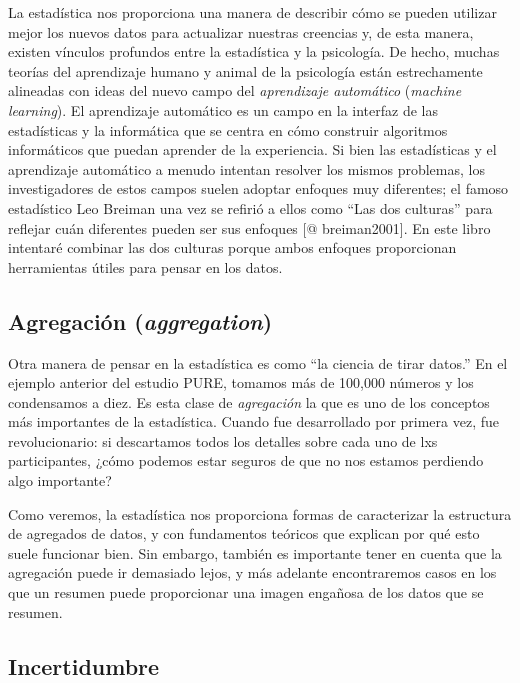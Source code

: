 \documentclass[
  12pt,
]{book}
\theoremstyle{definition}
\theoremstyle{definition}
\theoremstyle{definition}
\theoremstyle{remark}
\begin{document}
La estadística nos proporciona una manera de describir cómo se pueden utilizar mejor los nuevos datos para actualizar nuestras creencias y, de esta manera, existen vínculos profundos entre la estadística y la psicología. De hecho, muchas teorías del aprendizaje humano y animal de la psicología están estrechamente alineadas con ideas del nuevo campo del \emph{aprendizaje automático} (\emph{machine learning}). El aprendizaje automático es un campo en la interfaz de las estadísticas y la informática que se centra en cómo construir algoritmos informáticos que puedan aprender de la experiencia. Si bien las estadísticas y el aprendizaje automático a menudo intentan resolver los mismos problemas, los investigadores de estos campos suelen adoptar enfoques muy diferentes; el famoso estadístico Leo Breiman una vez se refirió a ellos como ``Las dos culturas'' para reflejar cuán diferentes pueden ser sus enfoques {[}@ breiman2001{]}. En este libro intentaré combinar las dos culturas porque ambos enfoques proporcionan herramientas útiles para pensar en los datos.

\hypertarget{agregaciuxf3n-aggregation}{%
\subsection{\texorpdfstring{Agregación (\emph{aggregation})}{Agregación (aggregation)}}\label{agregaciuxf3n-aggregation}}

Otra manera de pensar en la estadística es como ``la ciencia de tirar datos.'' En el ejemplo anterior del estudio PURE, tomamos más de 100,000 números y los condensamos a diez. Es esta clase de \emph{agregación} la que es uno de los conceptos más importantes de la estadística. Cuando fue desarrollado por primera vez, fue revolucionario: si descartamos todos los detalles sobre cada uno de lxs participantes, ¿cómo podemos estar seguros de que no nos estamos perdiendo algo importante?

Como veremos, la estadística nos proporciona formas de caracterizar la estructura de agregados de datos, y con fundamentos teóricos que explican por qué esto suele funcionar bien. Sin embargo, también es importante tener en cuenta que la agregación puede ir demasiado lejos, y más adelante encontraremos casos en los que un resumen puede proporcionar una imagen engañosa de los datos que se resumen.

\hypertarget{incertidumbre}{%
\subsection{Incertidumbre}\label{incertidumbre}}
\end{document}
